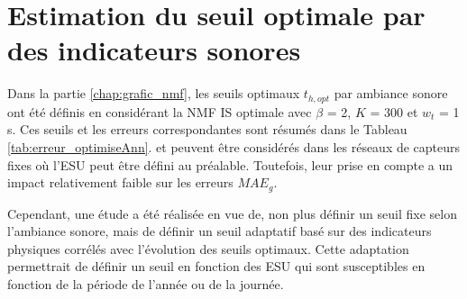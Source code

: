 \chapter{Estimation du seuil optimale par des indicateurs sonores}\label{annexe:optThreshold}

Dans la partie \ref{chap:grafic_nmf}, les seuils optimaux $t_{h,opt}$ par ambiance sonore ont été définis en considérant la NMF IS optimale avec $\beta$ = 2, $K$ = 300 et $w_t$ = 1 s. Ces seuils et les erreurs correspondantes  sont résumés dans le Tableau \ref{tab:erreur_optimiseAnn}.
et peuvent être considérés dans les réseaux de capteurs fixes où l'ESU peut être défini au préalable. Toutefois, leur prise en compte a un impact relativement faible sur les erreurs $MAE_g$. 

Cependant, une étude a été réalisée en vue de, non plus définir un seuil fixe selon l'ambiance sonore, mais de définir un seuil adaptatif basé sur des indicateurs physiques corrélés avec l'évolution des seuils optimaux. Cette adaptation permettrait de définir un seuil en fonction des ESU qui sont susceptibles en fonction de la période de l'année ou de la journée.

\begin{table}[h]
\centering
\caption{Erreurs $MAE_{60}$ minimales selon le seuil optimal $t_{h,opt}$ par ambiance sonore.}
\label{tab:erreur_optimiseAnn}
\end{table}


